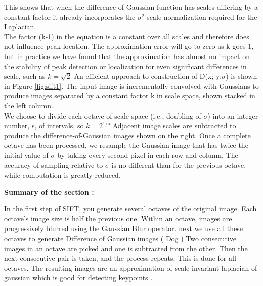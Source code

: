 This shows that when the difference-of-Gaussian function has scales differing by a constant
factor it already incorporates the  $\sigma ^2 $
scale normalization required for the Laplacian. \\The
factor (k-1) in the equation is a constant over all scales and therefore does not inﬂuence
peak location. The approximation error will go to zero as k goes 1, but in practice we have
found that the approximation has almost no impact on the stability of peak detection or
localization for even signiﬁcant differences in scale, such as $k= \sqrt{2}$
An efficient approach to construction of D(x; y;$\sigma$) is shown in Figure \ref{fig:sift1}. The input image
is incrementally convolved with Gaussians to produce images separated by a constant
factor k in scale space, shown stacked in the left column. \\We choose to divide each octave
of scale space (i.e., doubling of $\sigma$) into an integer number, s, of intervals, so $k = 2^{1/\mathbf{s}}$
Adjacent image scales are subtracted to produce the difference-of-Gaussian images shown
on the right. Once a complete octave has been processed, we resample the Gaussian image
that has twice the initial value of $\sigma$ by taking every second pixel in each row and column. \newline
\newline
The accuracy of sampling relative to $\sigma$ is no different than for the previous octave, while
computation is greatly reduced.

\textbf{Summary of the section :}

In the first step of SIFT, you generate several octaves of the original image. Each octave's image size is half the previous one. Within an octave, images are progressively blurred using the Gaussian Blur operator.
next we use all these octaves to generate Difference of Gaussian images ( Dog ) Two consecutive images in an octave are picked and one is subtracted from the other. Then the next consecutive pair is taken, and the process repeats. This is done for all octaves. The resulting images are an approximation of scale invariant laplacian of gaussian which is good for detecting keypoints .


